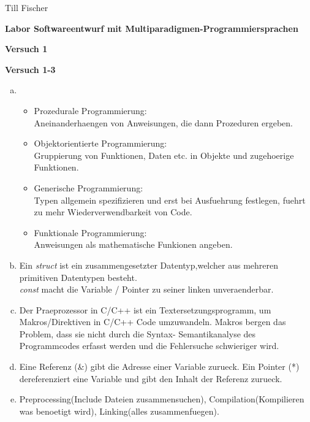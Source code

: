 \documentclass[german,10pt,oneside, fleqn, a4paper]{article}
\begin{document}
Till Fischer\\

    
\vspace{1cm}

\begin{center}
{\bf \Large Labor Softwareentwurf mit Multiparadigmen-Programmiersprachen} \\[2ex]
\end{center}
\begin{center}
{\bf \Large Versuch 1} \\[1ex]
\end{center}
\vspace{2cm}

{\bf Versuch 1-3} \\[2ex]
\begin{enumerate}[a)]
	\item 
	\begin{itemize}
		\item Prozedurale Programmierung: \\Aneinanderhaengen von Anweisungen, die dann Prozeduren ergeben.
		\item Objektorientierte Programmierung: \\Gruppierung von Funktionen, Daten etc. in Objekte und zugehoerige Funktionen.
		\item Generische Programmierung: \\Typen allgemein spezifizieren und erst bei Ausfuehrung festlegen, fuehrt zu mehr Wiederverwendbarkeit von Code.
		\item Funktionale Programmierung: \\Anweisungen als mathematische Funkionen angeben.
	\end{itemize}
	\item
		Ein \textit{struct} ist ein zusammengesetzter Datentyp,welcher aus mehreren primitiven Datentypen besteht.\\
		\textit{const} macht die Variable / Pointer zu seiner linken unveraenderbar.
	\item Der Praeprozessor in C/C++ ist ein Textersetzungsprogramm, um Makros/Direktiven in C/C++ Code umzuwandeln. Makros bergen das Problem, dass sie nicht durch die Syntax- Semantikanalyse des Programmcodes erfasst werden und die Fehlersuche schwieriger wird.
	\item Eine Referenz (\&) gibt die Adresse einer Variable zurueck. Ein Pointer (*) dereferenziert eine Variable und gibt den Inhalt der Referenz zurueck.
	\item Preprocessing(Include Dateien zusammensuchen), Compilation(Kompilieren was benoetigt wird), Linking(alles zusammenfuegen).
	
\end{enumerate}
\end{document}
